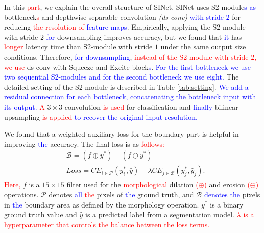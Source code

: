 \documentclass[10pt,twocolumn,letterpaper]{article}
\newcommand\Lars[1]{\textcolor{blue}{#1}}
\newcommand\nj[1]{\textcolor{red}{#1}}
\newcommand\Lars[1]{#1}
\newcommand\nj[1]{#1}
\begin{document}
In this \nj{part}, we explain the overall structure of SINet.
SINet uses S2-module\Lars{s} \Lars{as} bottleneck\nj{s} and depthwise separable convolution \textit{(ds-conv)} \Lars{with stride $2$} for reducing \nj{the resolution of} \Lars{feature maps}.
Empirically, applying the S2-module with stride $2$ \Lars{for} downsampling improves accuracy, but we found that \Lars{it} has \nj{longer} latency time than S2-module with stride $1$  under the same output size conditions.
Therefore, \Lars{for downsampling}, \nj{instead of the S2-module with stride 2, we use} ds-conv with Squeeze-and-Excite block\Lars{s}.
\Lars{For the first bottleneck we use two sequential S2-modules and for the second bottleneck we use eight. }
The detailed setting of the S2-module is described in Table \ref{tab:setting}.
\Lars{We add a residual connection for each bottleneck, concatenating the bottleneck input with its output.}
\nj{A} $3\times3$ convolution \nj{is used} for classification and \Lars{finally} bilinear upsampling \nj{is applied} \Lars{to recover the original input resolution. }

We found that a weighted auxiliary loss for the boundary part is helpful in improving \Lars{the} accuracy.
The final loss is as \nj{follows:}
\begin{equation}
\begin{aligned}
& \mathcal{B} = (f \oplus y^*) - (f \ominus y^*) \\
& Loss = CE_{i \in \mathcal{P}}(y_i^*, \hat{y}) + \lambda CE_{j \in \mathcal{B}}(y_j^*, \hat{y}_j).
\end{aligned}
\label{eq:loss}
\end{equation}
\nj{Here,} $f$ is a $15\times15$ filter used for the \nj{morphological} dilation \nj{($\oplus$)} and erosion \nj{($\ominus$)} operations.
$\mathcal{P}$ denotes \Lars{all} \nj{the} pixels of \Lars{the} ground truth, and $\mathcal{B}$ \Lars{denotes the} pixels in \Lars{the} boundary area as defined by the morphology operation. 
$y^*$ is a binary ground truth value and $\hat{y}$ is a predicted label from a segmentation model. \nj{$\lambda$ is a hyperparameter that controls the balance between the loss terms.}
\end{document}
